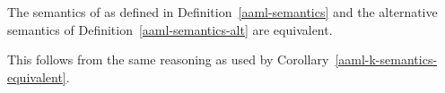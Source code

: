 \begin{corollary}\label{aaml-s-semantics-equivalent}
The semantics of \logicAamlS{} as defined in Definition~\ref{aaml-semantics} and the alternative semantics of Definition~\ref{aaml-semantics-alt} are equivalent.
\end{corollary}

This follows from the same reasoning as used by Corollary~\ref{aaml-k-semantics-equivalent}.
